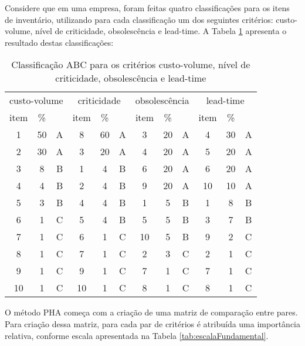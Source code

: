 \documentclass{book}
\begin{document}
Considere que em uma empresa, foram feitas quatro classificações para os itens de inventário, utilizando para cada classificação um dos seguintes critérios: custo-volume, nível de criticidade, obsolescência e lead-time. A Tabela \ref{tab:classABC} apresenta o resultado destas classificações:

\begin{table}[h]
\begin{center}
\begin{tabular}[c]{c c c | c c c | c c c | c c c}
\multicolumn{3}{c}{custo-volume} & \multicolumn{3}{c}{criticidade} & \multicolumn{3}{c}{obsolescência} & \multicolumn{3}{c}{lead-time} \\
item & \% & & item & \% & & item & \% & & item & \% & \\
1 & 50 & A & 8 & 60 & A & 3 & 20 & A & 4 & 30 & A \\
2 & 30 & A & 3 & 20 & A & 4 & 20 & A & 5 & 20 & A \\
3 & 8  & B & 1 & 4 & B  & 6 & 20 & A & 6 & 20 & A \\
4 & 4  & B & 2 & 4 & B  & 9 & 20 & A & 10 & 10 & A \\
5 & 3  & B & 4 & 4 & B  & 1 & 5 & B & 1 & 8 & B \\
6 & 1  & C & 5 & 4 & B  & 5 & 5 & B & 3 & 7 & B \\
7 & 1  & C & 6 & 1 & C  & 10 & 5 & B & 9 & 2 & C \\
8 & 1  & C & 7 & 1 & C  & 2 & 3 & C  & 2 & 1 & C \\
9 & 1  & C & 9 & 1 & C  & 7 & 1 & C  & 7 & 1 & C \\
10 & 1  & C & 10 & 1 & C & 8 & 1 & C & 8 & 1 & C \\
\end{tabular}
\caption{Classificação ABC para os critérios custo-volume, nível de criticidade, obsolescência e lead-time}
\label{tab:classABC}
\end{center}
\end{table}

O método PHA começa com a criação de uma matriz de comparação entre pares. Para criação dessa matriz, para cada par de critérios é atribuída uma importância relativa, conforme escala apresentada na Tabela \ref{tab:escalaFundamental}.
\end{document}
